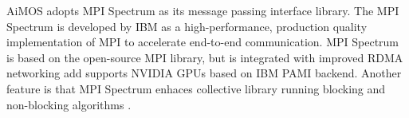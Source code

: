 
AiMOS adopts MPI Spectrum as its message passing interface library. The MPI Spectrum is developed by IBM as a high-performance, production quality implementation of MPI to accelerate end-to-end communication. MPI Spectrum is based on the open-source MPI library, but is integrated with improved RDMA networking add supports NVIDIA GPUs based on IBM PAMI backend. Another feature is that MPI Spectrum enhaces collective library running blocking and non-blocking algorithms \cite{IBMmpiSpectrum}.
